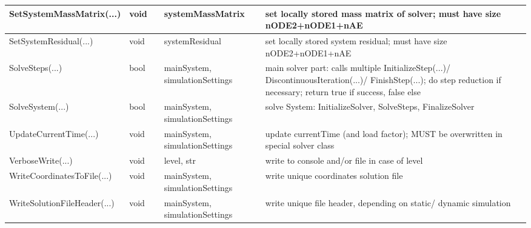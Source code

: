 \begin{center}
\begin{longtable}{| p{4.2cm} | p{2.5cm} | p{0.3cm} | p{3.0cm} | p{6cm} |}
    SetSystemMassMatrix(...) &     void &      &     systemMassMatrix &     set locally stored mass matrix of solver; must have size nODE2+nODE1+nAE\\ \hline
    SetSystemResidual(...) &     void &      &     systemResidual &     set locally stored system residual; must have size nODE2+nODE1+nAE\\ \hline
    SolveSteps(...) &     bool &      &     mainSystem, simulationSettings &     main solver part: calls multiple InitializeStep(...)/ DiscontinuousIteration(...)/ FinishStep(...); do step reduction if necessary; return true if success, false else\\ \hline
    SolveSystem(...) &     bool &      &     mainSystem, simulationSettings &     solve System: InitializeSolver, SolveSteps, FinalizeSolver\\ \hline
    UpdateCurrentTime(...) &     void &      &     mainSystem, simulationSettings &     update currentTime (and load factor); MUST be overwritten in special solver class\\ \hline
    VerboseWrite(...) &     void &      &     level, str &     write to console and/or file in case of level\\ \hline
    WriteCoordinatesToFile(...) &     void &      &     mainSystem, simulationSettings &     write unique coordinates solution file\\ \hline
    WriteSolutionFileHeader(...) &     void &      &     mainSystem, simulationSettings &     write unique file header, depending on static/ dynamic simulation\\ \hline
	  \end{longtable}
	\end{center}
